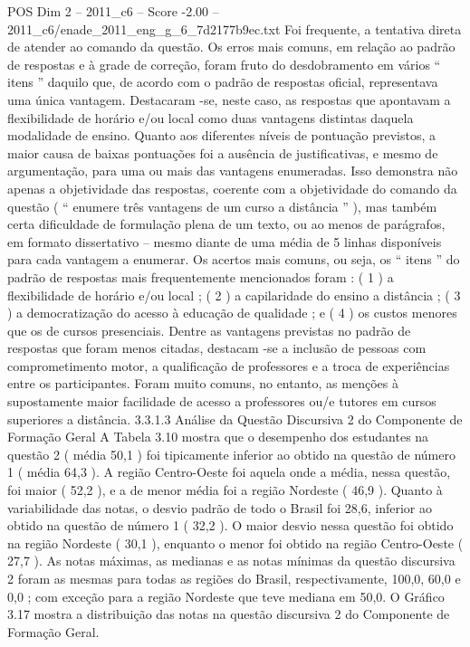\begin{textsample}{POS Dim 2 – 2011\_c6 – Score -2.00 – 2011\_c6/enade\_2011\_eng\_g\_6\_7d2177b9ec.txt}
Foi frequente, a tentativa direta de atender ao comando da questão.
Os erros mais comuns, em relação ao padrão de respostas e à grade de correção, foram fruto do desdobramento em vários “ itens ” daquilo que, de acordo com o padrão de respostas oficial, representava uma única vantagem.
Destacaram -se, neste caso, as respostas que apontavam a flexibilidade de horário e/ou local como duas vantagens distintas daquela modalidade de ensino.
Quanto aos diferentes níveis de pontuação previstos, a maior causa de baixas pontuações foi a ausência de justificativas, e mesmo de argumentação, para uma ou mais das vantagens enumeradas.
Isso demonstra não apenas a objetividade das respostas, coerente com a objetividade do comando da questão ( “ enumere três vantagens de um curso a distância ” ), mas também certa dificuldade de formulação plena de um texto, ou ao menos de parágrafos, em formato dissertativo – mesmo diante de uma média de 5 linhas disponíveis para cada vantagem a enumerar.
Os acertos mais comuns, ou seja, os “ itens ” do padrão de respostas mais frequentemente mencionados foram : ( 1 ) a flexibilidade de horário e/ou local ; ( 2 ) a capilaridade do ensino a distância ; ( 3 ) a democratização do acesso à educação de qualidade ; e ( 4 ) os custos menores que os de cursos presenciais.
Dentre as vantagens previstas no padrão de respostas que foram menos citadas, destacam -se a inclusão de pessoas com comprometimento motor, a qualificação de professores e a troca de experiências entre os participantes.
Foram muito comuns, no entanto, as menções à supostamente maior facilidade de acesso a professores ou/e tutores em cursos superiores a distância. 3.3.1.3 Análise da Questão Discursiva 2 do Componente de Formação Geral A Tabela 3.10 mostra que o desempenho dos estudantes na questão 2 ( média 50,1 ) foi tipicamente inferior ao obtido na questão de número 1 ( média 64,3 ).
A região Centro-Oeste foi aquela onde a média, nessa questão, foi maior ( 52,2 ), e a de menor média foi a região Nordeste ( 46,9 ).
Quanto à variabilidade das notas, o desvio padrão de todo o Brasil foi 28,6, inferior ao obtido na questão de número 1 ( 32,2 ).
O maior desvio nessa questão foi obtido na região Nordeste ( 30,1 ), enquanto o menor foi obtido na região Centro-Oeste ( 27,7 ).
As notas máximas, as medianas e as notas mínimas da questão discursiva 2 foram as mesmas para todas as regiões do Brasil, respectivamente, 100,0, 60,0 e 0,0 ; com exceção para a região Nordeste que teve mediana em 50,0.
O Gráfico 3.17 mostra a distribuição das notas na questão discursiva 2 do Componente de Formação Geral.

\end{textsample}
